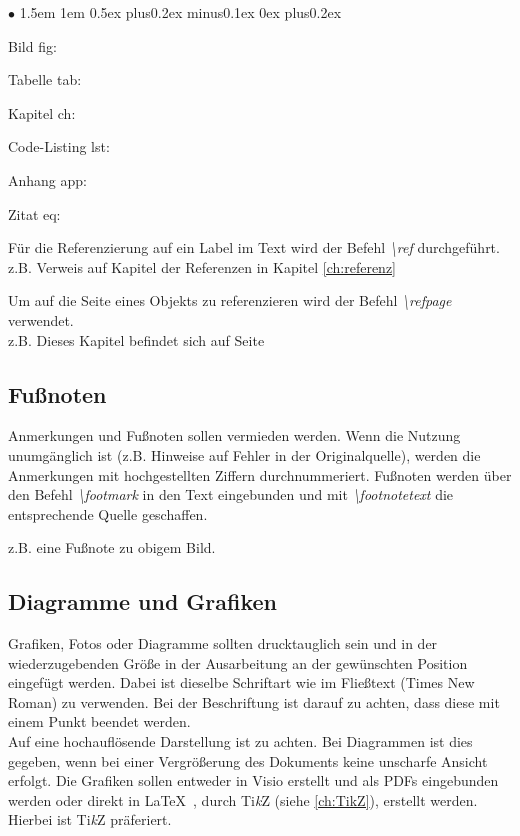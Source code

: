 \documentclass[13pt,a4paper, listof=entryprefix, bibliography=totocnumbered,toc=listofnumbered,lof=listofnumbered]{scrartcl}
\newenvironment{FHitemize}{\begin{list}{$\bullet$} {\leftmargin1.5em \labelsep1em \rightmargin0cm \parsep0.5ex plus0.2ex minus0.1ex \itemsep0ex plus0.2ex}}{\end{list}}
\begin{document}
\begin{FHitemize}
	\item Bild fig:
	\item Tabelle tab:
	\item Kapitel ch:
	\item Code-Listing lst:
	\item Anhang app:
	\item Zitat eq:
\end{FHitemize}

Für die Referenzierung auf ein Label im Text wird der Befehl \textit{\textbackslash ref} durchgeführt.\\
z.B. Verweis auf Kapitel der Referenzen in Kapitel \ref{ch:referenz}

Um auf die Seite eines Objekts zu referenzieren wird der Befehl \textit{\textbackslash refpage} verwendet.\\
z.B. Dieses Kapitel befindet sich auf Seite \pageref{ch:referenz}

\subsection{Fußnoten}
\label{ch:fussnoten}
Anmerkungen und Fußnoten sollen vermieden werden. Wenn die Nutzung unumgänglich ist (z.B. Hinweise auf Fehler in der Originalquelle), werden die Anmerkungen mit hochgestellten Ziffern durchnummeriert. Fußnoten werden über den Befehl \textit{\textbackslash footmark} in den Text eingebunden und mit \textit{\textbackslash footnotetext} die entsprechende Quelle geschaffen.

z.B. eine Fußnote zu obigem Bild\footnotemark .

\subsection{Diagramme und Grafiken}
\label{ch:bilder}
Grafiken, Fotos oder Diagramme sollten drucktauglich sein und in der wiederzugebenden Größe in der Ausarbeitung an der gewünschten Position eingefügt werden. Dabei ist dieselbe Schriftart wie im Fließtext (Times New Roman) zu verwenden. Bei der Beschriftung ist darauf zu achten, dass diese mit einem Punkt beendet werden.\\
Auf eine hochauflösende Darstellung ist zu achten. Bei Diagrammen ist dies gegeben, wenn bei einer Vergrößerung des Dokuments keine unscharfe Ansicht erfolgt. Die Grafiken sollen entweder in Visio erstellt und als PDFs eingebunden werden oder direkt in \LaTeX \ , durch Ti\textit{k}Z (siehe \ref{ch:TikZ}), erstellt werden. Hierbei ist Ti\textit{k}Z präferiert.
\end{document}
